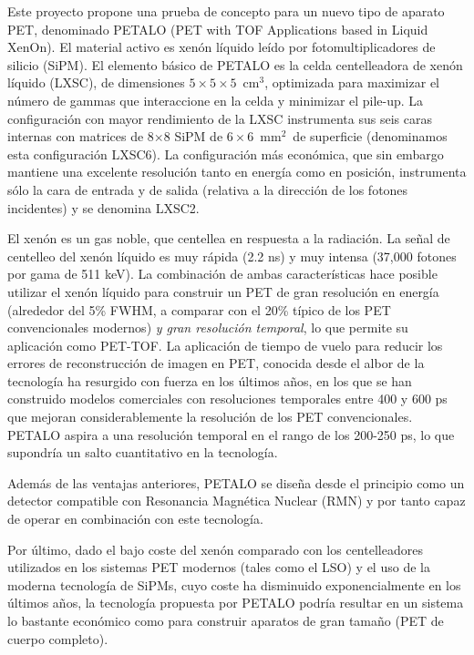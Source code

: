 Este proyecto propone una prueba de concepto para un nuevo tipo de aparato PET, denominado PETALO (PET with TOF Applications based in Liquid XenOn). El material activo es xenón líquido leído por fotomultiplicadores de silicio (SiPM). El elemento básico de PETALO es la celda centelleadora de xenón líquido (LXSC), de dimensiones $5\times 5 \times 5$~cm$^3$, optimizada para maximizar el número de gammas que interaccione en la celda y minimizar el pile-up. La configuración con mayor rendimiento de la LXSC instrumenta sus seis caras internas con matrices de 8$\times$8 SiPM de $6 \times 6$~mm$^2$~de superficie (denominamos esta configuración LXSC6). La configuración más económica, que sin embargo mantiene una excelente resolución tanto en energía como en posición, instrumenta sólo la cara de entrada y de salida (relativa a la dirección de los fotones incidentes) y se denomina LXSC2.

El xenón es un gas noble, que centellea en respuesta a la radiación. La señal de centelleo del xenón líquido es muy rápida (2.2 ns) y muy intensa (37,000 fotones por gama de 511 keV). La combinación de ambas características hace posible utilizar el xenón líquido para construir un PET de gran resolución en energía (alrededor del 5\% FWHM, a comparar con el 20\% típico de los PET convencionales modernos) {\em y gran resolución temporal}, lo que permite su aplicación como PET-TOF. La aplicación de tiempo de vuelo para reducir los errores de reconstrucción de imagen en PET, conocida desde el albor de la tecnología ha resurgido con fuerza en los últimos años, en los que se han construido modelos comerciales con resoluciones temporales entre 400 y 600 ps que mejoran considerablemente la resolución de los PET convencionales. PETALO aspira a una resolución temporal en el rango de los 200-250 ps, lo que supondría un salto cuantitativo en la tecnología.

Además de las ventajas anteriores, PETALO se diseña desde el principio como un detector compatible con Resonancia Magnética Nuclear (RMN) y por tanto capaz de operar en combinación con este tecnología.

Por último, dado el bajo coste del xenón comparado con los centelleadores utilizados en los sistemas PET modernos (tales como el LSO) y el uso de la moderna tecnología de SiPMs, cuyo coste ha disminuido exponencialmente en los últimos años, la tecnología propuesta por PETALO podría resultar en un sistema lo bastante económico como para construir aparatos de gran tamaño (PET de cuerpo completo). 


